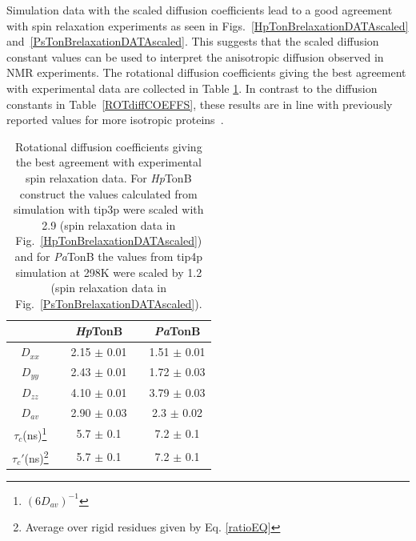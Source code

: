 \documentclass[pre,aps,floatfix,authordate1-4,twocolumn]{revtex4-1}
\begin{document}
Simulation data with the scaled diffusion coefficients 
lead to a good agreement with spin relaxation experiments as seen
in Figs.~\ref{HpTonBrelaxationDATAscaled} and~\ref{PsTonBrelaxationDATAscaled}.
This suggests that the scaled diffusion constant values can be used to interpret
the anisotropic diffusion observed in NMR experiments.
The rotational diffusion coefficients giving the best agreement with experimental 
data are collected in Table \ref{ROTdiffCOEFFSscaled}.
In contrast to the diffusion constants in Table~\ref{ROTdiffCOEFFS},
these results are in line with previously reported values for more isotropic
proteins~\cite{krishnan98}.
\begin{table}[!h]
  \centering
  \caption{Rotational diffusion coefficients giving the best agreement with experimental spin relaxation data.
    For {\it Hp}TonB construct the values calculated from simulation with tip3p were scaled with 2.9
    (spin relaxation data in Fig.~\ref{HpTonBrelaxationDATAscaled}) and  for {\it Pa}TonB
    the values from tip4p simulation at 298K were scaled by 1.2 (spin relaxation data in
    Fig.~\ref{PsTonBrelaxationDATAscaled}). 
  }\label{ROTdiffCOEFFSscaled}
  \begin{tabular}{c c c c c}
    &    &  {\it Hp}TonB  &  & {\it Pa}TonB \\
    \hline
    $D_{xx}$        &    &   2.15 $\pm$ 0.01  & & 1.51  $\pm$ 0.01\\
    $D_{yy}$        &    &  2.43  $\pm$ 0.01  & & 1.72  $\pm$ 0.03\\
    $D_{zz}$        &    &  4.10   $\pm$ 0.01 & & 3.79  $\pm$ 0.03\\
    $D_{av}$        &    &   2.90  $\pm$ 0.03  & & 2.3  $\pm$ 0.02\\
    $\tau_{c}$(ns)\footnote{$(6D_{av})^{-1}$}  &    &  5.7   $\pm$ 0.1  & & 7.2 $\pm$ 0.1 \\
    $\tau_{c}'$(ns)\footnote{Average over rigid residues given by Eq. \ref{ratioEQ}}  &    &  5.7   $\pm$ 0.1  & & 7.2 $\pm$ 0.1 \\
\end{tabular}
\end{table} 
\end{document}
